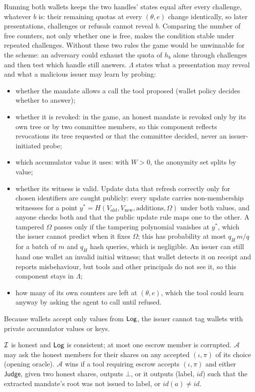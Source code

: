 Running both wallets keeps the two handles' states equal after every challenge, whatever $b$ is: their remaining quotas at every $(\theta,e)$ change identically, so later presentations, challenges or refusals cannot reveal $b$. Comparing the number of free counters, not only whether one is free, makes the condition stable under repeated challenges. Without these two rules the game would be unwinnable for the scheme: an adversary could exhaust the quota of $h_b$ alone through challenges and then test which handle still answers.
$\Lambda$ states what a presentation may reveal and what a malicious issuer may learn by probing:
\begin{itemize}[leftmargin=*]
\item whether the mandate allows a call the tool proposed (wallet policy decides whether to answer);
\item whether it is revoked: in the game, an honest mandate is revoked only by its own tree or by two committee members, so this component reflects revocations its tree requested or that the committee decided, never an issuer-initiated probe;
\item which accumulator value it uses: with $W>0$, the anonymity set splits by value;
\item whether its witness is valid. Update data that refresh correctly only for chosen identifiers are caught publicly: every update carries non-membership witnesses for a point $y^*=H(V_{\text{old}},V_{\text{new}},\text{additions},\Omega)$ under both values, and anyone checks both and that the public update rule maps one to the other. A tampered $\Omega$ passes only if the tampering polynomial vanishes at $y^*$, which the issuer cannot predict when it fixes $\Omega$; this has probability at most $q_H\,m/q$ for a batch of $m$ and $q_H$ hash queries, which is negligible. An issuer can still hand one wallet an invalid initial witness; that wallet detects it on receipt and reports misbehaviour, but tools and other principals do not see it, so this component stays in $\Lambda$;
\item how many of its own counters are left at $(\theta,e)$, which the tool could learn anyway by asking the agent to call until refused.
\end{itemize}
Because wallets accept only values from $\mathsf{Log}$, the issuer cannot tag wallets with private accumulator values or keys.

\begin{definition}[TRACE]\label{def:trace}
$\mathcal{I}$ is honest and $\mathsf{Log}$ is consistent; at most one escrow member is corrupted. $\mathcal{A}$ may ask the honest members for their shares on any accepted $(\iota,\pi)$ of its choice (opening oracle). $\mathcal{A}$ wins if a tool requiring escrow accepts $(\iota,\pi)$ and either $\mathsf{Judge}$, given two honest shares, outputs $\bot$, or it outputs (label, $\mathit{id}$) such that the extracted mandate's root was not issued to label, or $\mathit{id}(a)\neq\mathit{id}$.
\end{definition}

